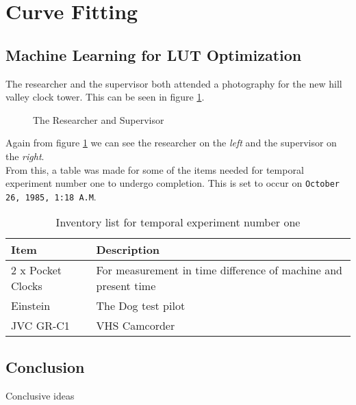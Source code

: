 \section{Curve Fitting}
\label{sec: curve fitting}

\subsection{Machine Learning for LUT Optimization}

The researcher and the supervisor both attended a photography for the new hill valley clock tower. This can be seen in figure \ref{fig:clock tower photo}.

\begin{figure}[h!]
    \centering
    \caption{The Researcher and Supervisor}
    \label{fig:clock tower photo}
\end{figure}

\noindent Again from figure \ref{fig:clock tower photo} we can see the researcher on the \textit{left} and the supervisor on the \textit{right}.\\

From this, a table was made for some of the items needed for temporal experiment number one to undergo completion. This is set to occur on \texttt{October 26, 1985, 1:18 A.M}.

\begin{table}[H] 
\begin{tabularx}{\textwidth}{| X | X |}
    \hline
     Item & Description  \\ \hline
     2 x Pocket Clocks & For measurement in time difference of machine and present time \\ \hline
     Einstein & The Dog test pilot \\ \hline
     JVC GR-C1 & VHS Camcorder \\ \hline
\end{tabularx}
\caption{Inventory list for temporal experiment number one}
\label{table: inventory}
\end{table}

\subsection{Conclusion}
Conclusive ideas